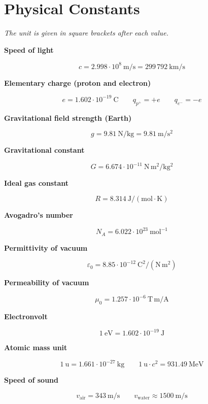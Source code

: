 \documentclass[11pt]{article}
\newcommand{\sect}[2]{\section*{\color{#1}#2}}
\newcommand{\sub}[1]{\par\medskip\textbf{#1}\par}
\newcommand{\expl}[1]{{\color{gray}\itshape #1}\par}
\begin{document}
\sect{cCon}{Physical Constants}
\expl{The unit is given in square brackets after each value.}

\sub{Speed of light}
\[ c = 2.998\cdot 10^{8}\ \mathrm{m/s} = 299\,792\ \mathrm{km/s} \]

\sub{Elementary charge (proton and electron)}
\[ e = 1.602\cdot 10^{-19}\ \mathrm{C} \qquad q_{p^+} = +e \qquad q_{e^-} = -e \]

\sub{Gravitational field strength (Earth)}
\[ g = 9.81\ \mathrm{N/kg} = 9.81\ \mathrm{m/s^2} \]

\sub{Gravitational constant}
\[ G = 6.674\cdot 10^{-11}\ \mathrm{N\,m^2/kg^2} \]

\sub{Ideal gas constant}
\[ R = 8.314\ \mathrm{J/(mol\cdot K)} \]

\sub{Avogadro's number}
\[ N_A = 6.022\cdot 10^{23}\ \mathrm{mol^{-1}} \]

\sub{Permittivity of vacuum}
\[ \varepsilon_0 = 8.85\cdot 10^{-12}\ \mathrm{C^2/(N\,m^2)} \]

\sub{Permeability of vacuum}
\[ \mu_0 = 1.257\cdot 10^{-6}\ \mathrm{T\,m/A} \]

\sub{Electronvolt}
\[ 1\ \mathrm{eV} = 1.602\cdot 10^{-19}\ \mathrm{J} \]

\sub{Atomic mass unit}
\[ 1\ \mathrm{u} = 1.661\cdot 10^{-27}\ \mathrm{kg} \qquad 1\ \mathrm{u}\cdot c^2 = 931.49\ \mathrm{MeV} \]

\sub{Speed of sound}
\[ v_{\text{air}} = 343\ \mathrm{m/s} \qquad v_{\text{water}} \approx 1500\ \mathrm{m/s} \]
\end{document}
